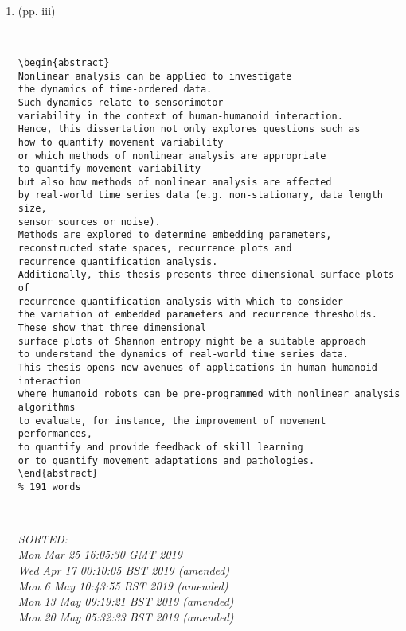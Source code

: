 \documentclass[12pt]{article}
\begin{document}
\begin{enumerate}

\item  (pp. iii)  \\ 


\begin{verbatim}


\begin{abstract}
Nonlinear analysis can be applied to investigate 
the dynamics of time-ordered data.
Such dynamics relate to sensorimotor 
variability in the context of human-humanoid interaction.
Hence, this dissertation not only explores questions such as 
how to quantify movement variability 
or which methods of nonlinear analysis are appropriate 
to quantify movement variability 
but also how methods of nonlinear analysis are affected 
by real-world time series data (e.g. non-stationary, data length size, 
sensor sources or noise).
Methods are explored to determine embedding parameters, 
reconstructed state spaces, recurrence plots and 
recurrence quantification analysis. 
Additionally, this thesis presents three dimensional surface plots of 
recurrence quantification analysis with which to consider 
the variation of embedded parameters and recurrence thresholds.
These show that three dimensional 
surface plots of Shannon entropy might be a suitable approach 
to understand the dynamics of real-world time series data. 
This thesis opens new avenues of applications in human-humanoid interaction
where humanoid robots can be pre-programmed with nonlinear analysis algorithms 
to evaluate, for instance, the improvement of movement performances,
to quantify and provide feedback of skill learning
or to quantify movement adaptations and pathologies.
\end{abstract}
% 191 words



	\end{verbatim}
	\textit{
	SORTED: \\ 
	Mon Mar 25 16:05:30 GMT 2019 \\ 
 	Wed Apr 17 00:10:05 BST 2019 (amended) \\
	Mon  6 May 10:43:55 BST 2019 (amended) \\
	Mon 13 May 09:19:21 BST 2019 (amended) \\
	Mon 20 May 05:32:33 BST 2019 (amended)
	}
	\\



\end{enumerate}
\end{document}
